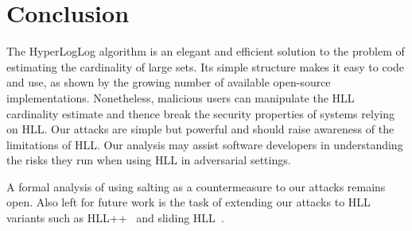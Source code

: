 \documentclass{IEEEtran}
\begin{document}
\section{Conclusion}\label{sec:conclusions}
The HyperLogLog algorithm is an elegant and efficient solution to the problem of estimating the cardinality of large sets. Its simple structure makes it easy to code and use, as shown by the growing number of available open-source implementations. Nonetheless, malicious users can manipulate the HLL cardinality estimate and thence break the security properties of systems relying on HLL. Our attacks are simple but powerful and should raise awareness of the limitations of HLL. Our analysis may assist software developers in understanding the risks they run when using HLL in adversarial settings.

A formal analysis of using salting as a countermeasure to our attacks remains open.
Also left for future work is the task of extending our attacks to HLL variants such as HLL++~\cite{hllpratice} and sliding HLL~\cite{slidinghll}.



\end{document}
